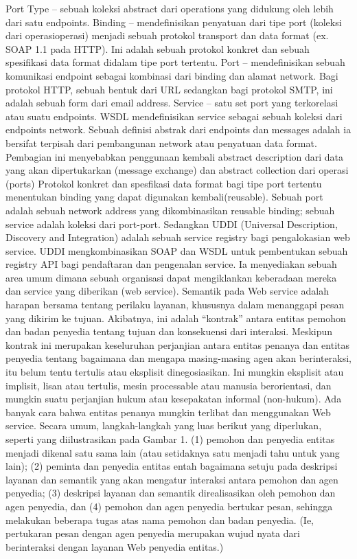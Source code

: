 \documentclass[a4paper,11pt]{book}
\begin{document}
Port Type – sebuah koleksi abstract dari operations yang didukung oleh lebih dari satu endpoints.
Binding – mendefinisikan penyatuan dari tipe port (koleksi dari operasioperasi) menjadi sebuah protokol transport dan data format (ex. SOAP 1.1 pada HTTP). Ini adalah sebuah protokol konkret dan sebuah spesifikasi data format didalam tipe port tertentu.
Port – mendefinisikan sebuah komunikasi endpoint sebagai kombinasi dari binding dan alamat network. Bagi protokol HTTP,  sebuah bentuk dari URL sedangkan bagi protokol SMTP, ini adalah sebuah form dari email address.
Service – satu set port yang terkorelasi atau suatu endpoints.
WSDL mendefinisikan service sebagai sebuah koleksi dari endpoints network. Sebuah definisi abstrak dari endpoints dan messages adalah ia bersifat terpisah dari pembangunan network atau penyatuan data format. Pembagian ini menyebabkan penggunaan kembali abstract description dari data yang akan dipertukarkan (message exchange) dan abstract collection dari operasi (ports) Protokol konkret dan spesfikasi data format bagi tipe port tertentu menentukan binding yang dapat digunakan kembali(reusable). Sebuah port adalah sebuah network address yang dikombinasikan reusable binding; sebuah service adalah koleksi dari port-port.
Sedangkan UDDI (Universal Description, Discovery and Integration) adalah sebuah service registry bagi pengalokasian web service. UDDI mengkombinasikan SOAP dan WSDL untuk pembentukan sebuah registry API bagi pendaftaran dan pengenalan service. Ia menyediakan sebuah area umum dimana sebuah organisasi dapat mengiklankan keberadaan mereka dan service yang diberikan (web service).
Semantik pada Web service adalah harapan bersama tentang perilaku layanan, khususnya dalam menanggapi pesan yang dikirim ke tujuan. Akibatnya, ini adalah “kontrak” antara entitas pemohon dan badan penyedia tentang tujuan dan konsekuensi dari interaksi. Meskipun kontrak ini merupakan keseluruhan perjanjian antara entitas penanya dan entitas penyedia tentang bagaimana dan mengapa masing-masing agen akan berinteraksi, itu belum tentu tertulis atau eksplisit dinegosiasikan. Ini mungkin eksplisit atau implisit, lisan atau tertulis, mesin processable atau manusia berorientasi, dan mungkin suatu perjanjian hukum atau kesepakatan informal (non-hukum).
Ada banyak cara bahwa entitas penanya mungkin terlibat dan menggunakan Web service. Secara umum, langkah-langkah yang luas berikut yang diperlukan, seperti yang diilustrasikan pada Gambar 1.  (1) pemohon dan penyedia entitas menjadi dikenal satu sama lain (atau setidaknya satu menjadi tahu untuk yang lain); (2) peminta dan penyedia entitas entah bagaimana setuju pada deskripsi layanan dan semantik yang akan mengatur interaksi antara pemohon dan agen penyedia; (3) deskripsi layanan dan semantik direalisasikan oleh pemohon dan agen penyedia, dan (4) pemohon dan agen penyedia bertukar pesan, sehingga melakukan beberapa tugas atas nama pemohon dan badan penyedia. (Ie, pertukaran pesan dengan agen penyedia merupakan wujud nyata dari berinteraksi dengan layanan Web penyedia entitas.)
\end{document}
